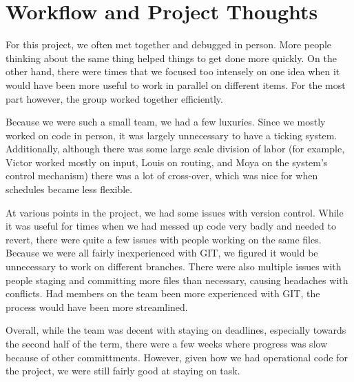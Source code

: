 

\section{Workflow and Project Thoughts}


	For this project, we often met together and debugged in person. More people thinking about the same thing helped things to get done more quickly. On the other hand, there were times that we focused too intensely on one idea when it would have been more useful to work in parallel on different items. For the most part however, the group worked together efficiently.
	
	Because we were such a small team, we had a few luxuries. Since we mostly worked on code in person, it was largely unnecessary to have a ticking system. Additionally, although there was some large scale division of labor (for example, Victor worked mostly on input, Louis on routing, and Moya on the system's control mechanism) there was a lot of cross-over, which was nice for when schedules became less flexible. 

	At various points in the project, we had some issues with version control. While it was useful for times when we had messed up code very badly and needed to revert, there were quite a few issues with people working on the same files. Because we were all fairly inexperienced with GIT, we figured it would be unnecessary to work on different branches. There were also multiple issues with people staging and committing more files than necessary, causing headaches with conflicts. Had members on the team been more experienced with GIT, the process would have been more streamlined. 
	
	Overall, while the team was decent with staying on deadlines, especially towards the second half of the term, there were a few weeks where progress was slow because of other committments. However, given how we had operational code for the project, we were still fairly good at staying on task. 
